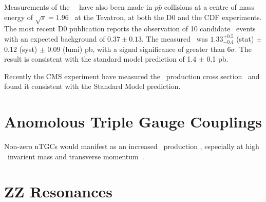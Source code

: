 Measurements of the \ZZ\ \cx\ have also been made in $p \bar{p}$
collisions at a centre of mass energy of $\sqrt{s} = 1.96$ \tev\ at the Tevatron, at
both the D0 and the CDF experiments. The most recent D0 publication reports the
observation of 10 candidate \ZZ\ events with an expected background of $0.37
\pm 0.13$. The measured \cx\ was $1.33^{+0.5}_{-0.4}$ (stat) $\pm$ 0.12
(syst) $\pm$ 0.09 (lumi) pb, with a signal significance of greater than
$6\sigma$. The result is consistent with the standard model prediction of 1.4
$\pm$ 0.1 pb. 

Recently the CMS experiment have measured the \ZZ\ production cross
section~\cite{CMS-PAS-EWK-11-010} and found it consistent with the Standard Model prediction.


\section{Anomolous Triple Gauge Couplings}
Non-zero nTGCs would manifest as an increased \ZZ\
production \cx, especially at high \ZZ\ invarient mass and transverse
momentum~\cite{Baur:2000ae}.

\section{ZZ Resonances}

